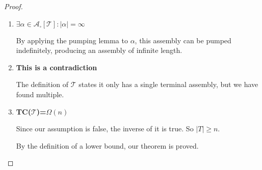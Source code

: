 \documentclass[12pt]{article}
\begin{document}
\begin{proof}
\begin{enumerate}
		\item \textbf{$\exists \alpha \in \mathcal{A}_\square[\mathcal{T}] : |\alpha| = \infty $}

            By applying the pumping lemma to $\alpha$, this assembly can be pumped indefinitely, producing an assembly of infinite length.

		\item \textbf{This is a contradiction}

		The definition of $\mathcal{T}$ states it only has a single terminal assembly, but we have found multiple.

		\item \textbf{TC($\mathcal{T}$)=$\Omega(n)$}

		Since our assumption is false, the inverse of it is true. So $|T| \geq n$.

		By the definition of a lower bound, our theorem is proved.

	\end{enumerate}
\end{proof}
\end{document}
